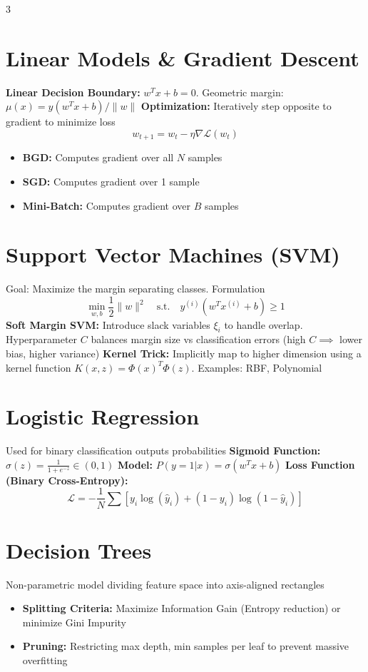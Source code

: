 \documentclass[8pt,landscape]{extarticle}
\begin{document}
\begin{multicols*}{3}
\section{Linear Models \& Gradient Descent}
\textbf{Linear Decision Boundary:} $w^T x + b = 0$. Geometric margin: $\mu(x) = y(w^T x + b) / \|w\|$ %
\textbf{Optimization:} Iteratively step opposite to gradient to minimize loss %
$$ w_{t+1} = w_t - \eta \nabla \mathcal{L}(w_t) $$ %
\begin{itemize}
    \item \textbf{BGD:} Computes gradient over all $N$ samples %
    \item \textbf{SGD:} Computes gradient over 1 sample %
    \item \textbf{Mini-Batch:} Computes gradient over $B$ samples %
\end{itemize}

\section{Support Vector Machines (SVM)}
Goal: Maximize the margin separating classes. Formulation %
$$ \min_{w,b} \frac{1}{2} \|w\|^2 \quad \text{s.t.} \quad y^{(i)}(w^T x^{(i)} + b) \geq 1 $$ %
\textbf{Soft Margin SVM:} Introduce slack variables $\xi_i$ to handle overlap. Hyperparameter $C$ balances margin size vs classification errors (high $C \implies$ lower bias, higher variance) %
\textbf{Kernel Trick:} Implicitly map to higher dimension using a kernel function $K(x, z) = \Phi(x)^T \Phi(z)$. Examples: RBF, Polynomial %

\section{Logistic Regression}
Used for binary classification outputs probabilities %
\textbf{Sigmoid Function:} $\sigma(z) = \frac{1}{1 + e^{-z}} \in (0, 1)$ %
\textbf{Model:} $P(y=1|x) = \sigma(w^T x + b)$ %
\textbf{Loss Function (Binary Cross-Entropy):}
$$ \mathcal{L} = -\frac{1}{N} \sum [y_i \log(\hat{y}_i) + (1-y_i) \log(1-\hat{y}_i)] $$ %

\section{Decision Trees}
Non-parametric model dividing feature space into axis-aligned rectangles %
\begin{itemize}
    \item \textbf{Splitting Criteria:} Maximize Information Gain (Entropy reduction) or minimize Gini Impurity %
    \item \textbf{Pruning:} Restricting max depth, min samples per leaf to prevent massive overfitting %
\end{itemize}


\end{multicols*}
\end{document}
